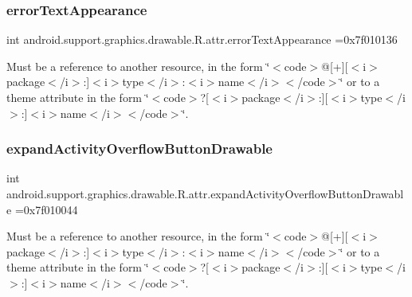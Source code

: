\subsubsection{\texorpdfstring{error\+Text\+Appearance}{errorTextAppearance}}
{\footnotesize\ttfamily int android.\+support.\+graphics.\+drawable.\+R.\+attr.\+error\+Text\+Appearance =0x7f010136\hspace{0.3cm}{\ttfamily [static]}}

Must be a reference to another resource, in the form \char`\"{}$<$code$>$@\mbox{[}+\mbox{]}\mbox{[}$<$i$>$package$<$/i$>$\+:\mbox{]}$<$i$>$type$<$/i$>$\+:$<$i$>$name$<$/i$>$$<$/code$>$\char`\"{} or to a theme attribute in the form \char`\"{}$<$code$>$?\mbox{[}$<$i$>$package$<$/i$>$\+:\mbox{]}\mbox{[}$<$i$>$type$<$/i$>$\+:\mbox{]}$<$i$>$name$<$/i$>$$<$/code$>$\char`\"{}. \mbox{\label{classandroid_1_1support_1_1graphics_1_1drawable_1_1R_1_1attr_aabd2fe64a80a08c45d3b69f8ddd38f9d}} 
\subsubsection{\texorpdfstring{expand\+Activity\+Overflow\+Button\+Drawable}{expandActivityOverflowButtonDrawable}}
{\footnotesize\ttfamily int android.\+support.\+graphics.\+drawable.\+R.\+attr.\+expand\+Activity\+Overflow\+Button\+Drawable =0x7f010044\hspace{0.3cm}{\ttfamily [static]}}

Must be a reference to another resource, in the form \char`\"{}$<$code$>$@\mbox{[}+\mbox{]}\mbox{[}$<$i$>$package$<$/i$>$\+:\mbox{]}$<$i$>$type$<$/i$>$\+:$<$i$>$name$<$/i$>$$<$/code$>$\char`\"{} or to a theme attribute in the form \char`\"{}$<$code$>$?\mbox{[}$<$i$>$package$<$/i$>$\+:\mbox{]}\mbox{[}$<$i$>$type$<$/i$>$\+:\mbox{]}$<$i$>$name$<$/i$>$$<$/code$>$\char`\"{}. \mbox{\label{classandroid_1_1support_1_1graphics_1_1drawable_1_1R_1_1attr_abd58fe740dde898b885f4a65ac1dee15}} 
